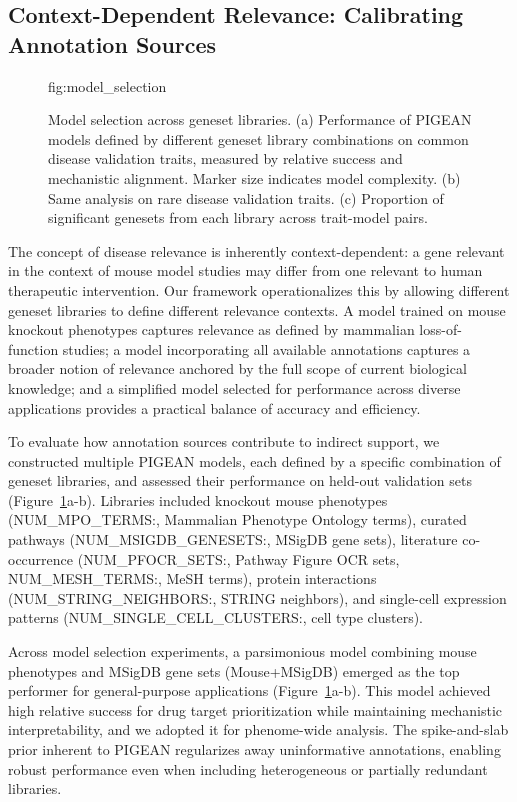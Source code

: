 \subsection{Context-Dependent Relevance: Calibrating Annotation Sources}

\begin{figure}[t!]
    \centering
    {{fig:model_selection}}
    \caption{Model selection across geneset libraries. (a) Performance of PIGEAN models defined by different geneset library combinations on common disease validation traits, measured by relative success and mechanistic alignment. Marker size indicates model complexity. (b) Same analysis on rare disease validation traits. (c) Proportion of significant genesets from each library across trait-model pairs.}
    \label{fig:model-selection}
\end{figure}

The concept of disease relevance is inherently context-dependent: a gene relevant in the context of mouse model studies may differ from one relevant to human therapeutic intervention. Our framework operationalizes this by allowing different geneset libraries to define different relevance contexts. A model trained on mouse knockout phenotypes captures relevance as defined by mammalian loss-of-function studies; a model incorporating all available annotations captures a broader notion of relevance anchored by the full scope of current biological knowledge; and a simplified model selected for performance across diverse applications provides a practical balance of accuracy and efficiency.

To evaluate how annotation sources contribute to indirect support, we constructed multiple PIGEAN models, each defined by a specific combination of geneset libraries, and assessed their performance on held-out validation sets (Figure~\ref{fig:model-selection}a-b). Libraries included knockout mouse phenotypes ({{NUM_MPO_TERMS:,}} Mammalian Phenotype Ontology terms), curated pathways ({{NUM_MSIGDB_GENESETS:,}} MSigDB gene sets), literature co-occurrence ({{NUM_PFOCR_SETS:,}} Pathway Figure OCR sets, {{NUM_MESH_TERMS:,}} MeSH terms), protein interactions ({{NUM_STRING_NEIGHBORS:,}} STRING neighbors), and single-cell expression patterns ({{NUM_SINGLE_CELL_CLUSTERS:,}} cell type clusters).


Across model selection experiments, a parsimonious model combining mouse phenotypes and MSigDB gene sets (Mouse+MSigDB) emerged as the top performer for general-purpose applications (Figure~\ref{fig:model-selection}a-b). This model achieved high relative success for drug target prioritization while maintaining mechanistic interpretability, and we adopted it for phenome-wide analysis. The spike-and-slab prior inherent to PIGEAN regularizes away uninformative annotations, enabling robust performance even when including heterogeneous or partially redundant libraries.

